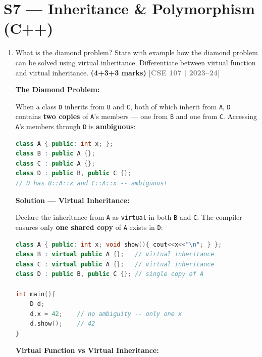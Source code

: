 \documentclass[12pt,a3paper]{article}
\newcommand{\yr}[1]{\hfill\textcolor{gray}{\small\textbf{[#1]}}}
\newcommand{\mk}[1]{\textcolor{orange!70!black}{\small\textbf{(#1 marks)}}}
\begin{document}
\section{S7 --- Inheritance \& Polymorphism (C++)}

\begin{enumerate}
\item What is the diamond problem? State with example how the diamond problem can be solved using virtual inheritance. Differentiate between virtual function and virtual inheritance. \mk{4+3+3}
\yr{CSE 107 | 2023--24}
\begin{tcolorbox}[enhanced,breakable,ansbox,colback=cG!4,colframe=cG,
  boxrule=0.8pt,arc=5pt,
  title={\textbf{Answer --- Diamond problem, virtual inheritance, virtual function vs virtual inheritance}},
  fonttitle=\bfseries\color{white},colbacktitle=cG]

\textbf{The Diamond Problem:}

When a class \texttt{D} inherits from \texttt{B} and \texttt{C},
both of which inherit from \texttt{A}, \texttt{D} contains
\textbf{two copies} of \texttt{A}'s members --- one from \texttt{B}
and one from \texttt{C}.  Accessing \texttt{A}'s members through
\texttt{D} is \textbf{ambiguous}:

\begin{lstlisting}[language=C++]
class A { public: int x; };
class B : public A {};
class C : public A {};
class D : public B, public C {};
// D has B::A::x and C::A::x -- ambiguous!
\end{lstlisting}

\textbf{Solution --- Virtual Inheritance:}

Declare the inheritance from \texttt{A} as \texttt{virtual} in both
\texttt{B} and \texttt{C}.  The compiler ensures only
\textbf{one shared copy} of \texttt{A} exists in \texttt{D}:

\begin{lstlisting}[language=C++]
class A { public: int x; void show(){ cout<<x<<"\n"; } };
class B : virtual public A {};   // virtual inheritance
class C : virtual public A {};   // virtual inheritance
class D : public B, public C {}; // single copy of A

int main(){
    D d;
    d.x = 42;    // no ambiguity -- only one x
    d.show();    // 42
}
\end{lstlisting}

\textbf{Virtual Function vs Virtual Inheritance:}


\end{tcolorbox}
\end{enumerate}
\end{document}
